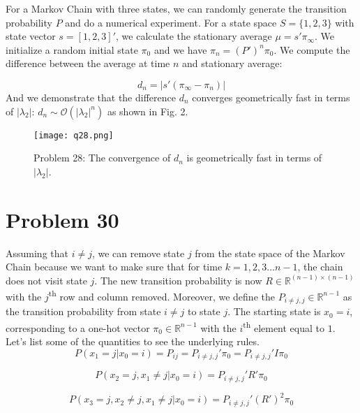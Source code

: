 \documentclass[a4paper, 11pt]{article}
\begin{document}
For a Markov Chain with three states, we can randomly generate the transition probability $P$ and do a numerical experiment. For a state space $S = \{1, 2, 3\}$ with state vector $s = [1, 2, 3]'$, we calculate the stationary average $\mu = s'\pi_\infty$. We initialize a random initial state $\pi_0$ and we have $\pi_n = (P')^n\pi_0$. We compute the difference between the average at time $n$ and stationary average: 

\begin{equation}
d_n = |s'(\pi_\infty - \pi_n)|
\end{equation}
And we demonstrate that the difference $d_n$ converges geometrically fast in terms of $|\lambda_2|$: $d_n \sim \mathcal{O}(|\lambda_2|^n)$ as shown in Fig. 2. 

\begin{figure}
	\begin{center}
		\texttt{[image: q28.png]}
		\caption{Problem 28: The convergence of $d_n$ is geometrically fast in terms of $|\lambda_2|$. }
	\end{center}
\end{figure}

\section*{Problem 30}

Assuming that $i \neq j$, we can remove state $j$ from the state space of the Markov Chain because we want to make sure that for time $k = 1, 2, 3 \dots n-1$, the chain does not visit state $j$. The new transition probability is now $R \in \mathbb{R}^{(n-1)\times (n-1)}$ with the $j$\textsuperscript{th} row and column removed. Moreover, we define the $P_{i\neq j, j} \in \mathbb{R}^{n-1}$ as the transition probability from state $i\neq j$ to state $j$. The starting state is $x_0 = i$, corresponding to a one-hot vector $\pi_0 \in \mathbb{R}^{n-1}$ with the $i$\textsuperscript{th} element equal to $1$. Let's list some of the quantities to see the underlying rules. 
\begin{equation}
P(x_1 = j | x_0 = i) = P_{ij} = P_{i\neq j, j}' \pi_0 = P_{i\neq j, j}' I \pi_0 
\end{equation}

\begin{equation}
P(x_2 = j, x_1 \neq j | x_0 = i) = P_{i\neq j, j}' R' \pi_0
\end{equation}

\begin{equation}
P(x_3 = j, x_2 \neq j, x_1 \neq j | x_0 = i) = P_{i\neq j, j}' (R')^2 \pi_0
\end{equation}
\end{document}
